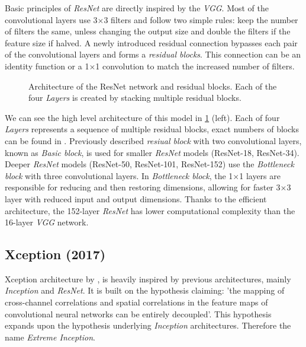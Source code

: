 Basic principles of \textit{ResNet} are directly inspired by the \textit{VGG}. Most of the convolutional layers use 3$\times$3 filters and follow two simple rules: keep the number of filters the same, unless changing the output size and double the filters if the feature size if halved. A newly introduced residual connection bypasses each pair of the convolutional layers and forms a \textit{residual blocks}. This connection can be an identity function or a 1$\times$1 convolution to match the increased number of filters.

\begin{figure}
    \resnetArch
    \caption[ResNet architecture]%
    {Architecture of the ResNet network and residual blocks. Each of the four \textit{Layers} is created by stacking multiple residual blocks.}
    \label{fig:resnet_arch}
\end{figure}

We can see the high level architecture of this model in \cref{fig:resnet_arch} (left). Each of four \textit{Layers} represents a sequence of multiple residual blocks, exact numbers of blocks can be found in \cite[table 1]{bib:resnet}. Previously described \textit{resiual block} with two convolutional layers, known as \textit{Basic block}, is used for smaller \textit{ResNet} models (ResNet-18, ResNet-34). Deeper \textit{ResNet} models (ResNet-50, ResNet-101, ResNet-152) use the \textit{Bottleneck block} with three convolutional layers. In \textit{Bottleneck block}, the 1$\times$1 layers are responsible for reducing and then restoring dimensions, allowing for faster 3$\times$3 layer with reduced input and output dimensions. Thanks to the efficient architecture, the 152-layer \textit{ResNet} has lower computational complexity than the 16-layer \textit{VGG} network.



\subsection{Xception (2017)}
\label{sec:xception}
Xception architecture by \citeauthor{bib:xception} \cite{bib:xception}, is heavily inspired by previous architectures, mainly \textit{Inception} and \textit{ResNet}. It is built on the hypothesis claiming: 'the mapping of cross-channel correlations and spatial correlations in the feature maps of convolutional neural networks can be entirely decoupled'. This hypothesis expands upon the hypothesis underlying \textit{Inception} architectures. Therefore the name \textit{Extreme Inception}. 

